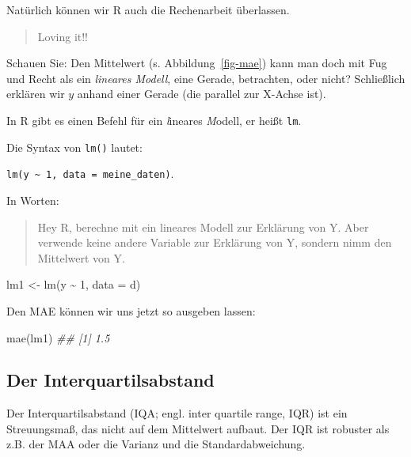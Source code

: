 \documentclass[
  a4paper,
]{scrbook}
\newenvironment{Shaded}{\begin{snugshade}}{\end{snugshade}}
\newcommand{\AttributeTok}[1]{\textcolor[rgb]{0.40,0.45,0.13}{#1}}
\newcommand{\DecValTok}[1]{\textcolor[rgb]{0.68,0.00,0.00}{#1}}
\newcommand{\DocumentationTok}[1]{\textcolor[rgb]{0.37,0.37,0.37}{\textit{#1}}}
\newcommand{\FunctionTok}[1]{\textcolor[rgb]{0.28,0.35,0.67}{#1}}
\newcommand{\NormalTok}[1]{\textcolor[rgb]{0.00,0.23,0.31}{#1}}
\newcommand{\OtherTok}[1]{\textcolor[rgb]{0.00,0.23,0.31}{#1}}
\newcommand{\SpecialCharTok}[1]{\textcolor[rgb]{0.37,0.37,0.37}{#1}}
\theoremstyle{definition}
\theoremstyle{definition}
\theoremstyle{definition}
\theoremstyle{remark}
\begin{document}
Natürlich können wir R auch die Rechenarbeit überlassen.

\begin{quote}
{} Loving it!!
\end{quote}

Schauen Sie: Den Mittelwert (s. Abbildung~\ref{fig-mae}) kann man doch
mit Fug und Recht als ein \emph{lineares Modell}, eine Gerade,
betrachten, oder nicht? Schließlich erklären wir \(y\) anhand einer
Gerade (die parallel zur X-Achse ist).

In R gibt es einen Befehl für ein \emph{l}ineares \emph{M}odell, er
heißt \texttt{lm}.

Die Syntax von \texttt{lm()} lautet:

\texttt{lm(y\ \textasciitilde{}\ 1,\ data\ =\ meine\_daten)}.

In Worten:

\begin{quote}
Hey R, berechne mit ein lineares Modell zur Erklärung von Y. Aber
verwende keine andere Variable zur Erklärung von Y, sondern nimm den
Mittelwert von Y.
\end{quote}

\begin{Shaded}
\begin{Highlighting}[]
\NormalTok{lm1 }\OtherTok{\textless{}{-}} \FunctionTok{lm}\NormalTok{(y }\SpecialCharTok{\textasciitilde{}} \DecValTok{1}\NormalTok{, }\AttributeTok{data =}\NormalTok{ d)}
\end{Highlighting}
\end{Shaded}

Den MAE können wir uns jetzt so ausgeben lassen:

\begin{Shaded}
\begin{Highlighting}[]
\FunctionTok{mae}\NormalTok{(lm1)}
\DocumentationTok{\#\# [1] 1.5}
\end{Highlighting}
\end{Shaded}

\subsection{Der Interquartilsabstand}\label{der-interquartilsabstand}

Der Interquartilsabstand (IQA; engl. inter quartile range, IQR) ist ein
Streuungsmaß, das nicht auf dem Mittelwert aufbaut. Der IQR ist robuster
als z.B. der MAA oder die Varianz und die Standardabweichung.
\end{document}
